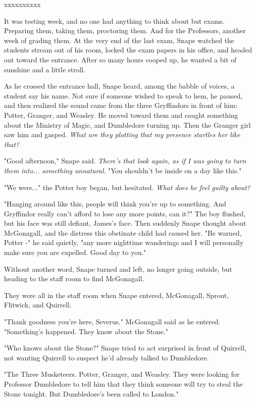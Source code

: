 \documentclass[a4paper,11pt]{article}
\begin{document}
xxxxxxxxxx

It was testing week, and no one had anything to think about but exams. Preparing them, taking them, proctoring them. And for the Professors, another week of grading them. At the very end of the last exam, Snape watched the students stream out of his room, locked the exam papers in his office, and headed out toward the entrance. After so many hours cooped up, he wanted a bit of sunshine and a little stroll.

As he crossed the entrance hall, Snape heard, among the babble of voices, a student say his name. Not sure if someone wished to speak to hem, he paused, and then realized the sound came from the three Gryffindors in front of him: Potter, Granger, and Weasley. He moved toward them and caught something about the Ministry of Magic, and Dumbledore turning up. Then the Granger girl saw him and gasped. \emph{What are they plotting that my presence startles her like that?}

"Good afternoon," Snape said. \emph{There's that look again, as if I was going to turn them into... something unnatural.} "You shouldn't be inside on a day like this."

"We were..." the Potter boy began, but hesitated. \emph{What does he feel guilty about?}

"Hanging around like this, people will think you're up to something. And Gryffindor really can't afford to lose any more points, can it?" The boy flushed, but his face was still defiant, James's face. Then suddenly Snape thought about McGonagall, and the distress this obstinate child had caused her. "Be warned, Potter -" he said quietly, "any more nighttime wanderings and I will personally make sure you are expelled. Good day to you."

Without another word, Snape turned and left, no longer going outside, but heading to the staff room to find McGonagall.

They were all in the staff room when Snape entered, McGonagall, Sprout, Flitwick, and Quirrell.

"Thank goodness you're here, Severus," McGonagall said as he entered. "Something's happened. They know about the Stone."

"Who knows about the Stone?" Snape tried to act surprised in front of Quirrell, not wanting Quirrell to suspect he'd already talked to Dumbledore.

"The Three Musketeers. Potter, Granger, and Weasley. They were looking for Professor Dumbledore to tell him that they think someone will try to steal the Stone tonight. But Dumbledore's been called to London."
\end{document}
